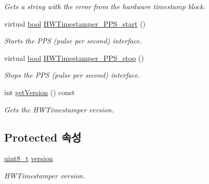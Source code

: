 \begin{DoxyCompactItemize}
\begin{DoxyCompactList}\small\item\em Gets a string with the error from the hardware timestamp block. \end{DoxyCompactList}\item 
virtual \hyperlink{avb__gptp_8h_af6a258d8f3ee5206d682d799316314b1}{bool} \hyperlink{class_common_timestamper_a2cbaeb84807ca61af0bc56bcc475468d}{H\+W\+Timestamper\+\_\+\+P\+P\+S\+\_\+start} ()
\begin{DoxyCompactList}\small\item\em Starts the P\+PS (pulse per second) interface. \end{DoxyCompactList}\item 
virtual \hyperlink{avb__gptp_8h_af6a258d8f3ee5206d682d799316314b1}{bool} \hyperlink{class_common_timestamper_ac5d9f1e5eb402dffaa8897367e9fd7d3}{H\+W\+Timestamper\+\_\+\+P\+P\+S\+\_\+stop} ()
\begin{DoxyCompactList}\small\item\em Stops the P\+PS (pulse per second) interface. \end{DoxyCompactList}\item 
int \hyperlink{class_common_timestamper_a4d1414f8d9ed8d83c91769b148106307}{get\+Version} () const 
\begin{DoxyCompactList}\small\item\em Gets the H\+W\+Timestamper version. \end{DoxyCompactList}\end{DoxyCompactItemize}
\subsection*{Protected 속성}
\begin{DoxyCompactItemize}
\item 
\hyperlink{stdint_8h_aba7bc1797add20fe3efdf37ced1182c5}{uint8\+\_\+t} \hyperlink{class_common_timestamper_ab22abc2906422da61885ac6c8e6a1a59}{version}
\begin{DoxyCompactList}\small\item\em H\+W\+Timestamper version. \end{DoxyCompactList}\end{DoxyCompactItemize}
